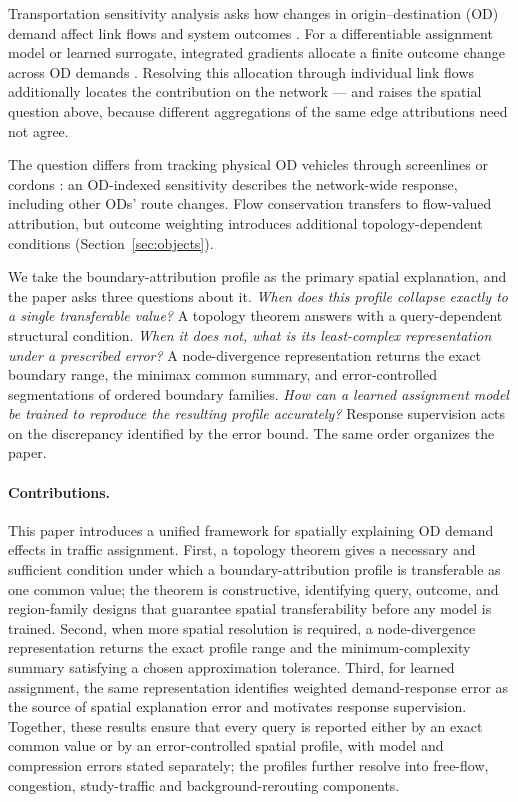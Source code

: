 \documentclass[a4paper,fleqn]{cas-sc}
\begin{document}
Transportation sensitivity analysis asks how changes in origin--destination
(OD) demand affect link flows and system outcomes
\citep{tobin1988sensitivity,josefsson2007sensitivity,patriksson2003aggregated}.
For a differentiable assignment model or learned surrogate, integrated
gradients allocate a finite outcome change across OD demands
\citep{sundararajan2017axiomatic}. Resolving this allocation through
individual link flows additionally locates the contribution on the
network --- and raises the spatial question above, because different
aggregations of the same edge attributions need not agree.

The question differs from tracking physical OD vehicles through screenlines
or cordons \citep{sheffi1985urban,vanzuylen1980most,bar2002origin}:
an OD-indexed sensitivity describes the network-wide response,
including other ODs' route changes. Flow conservation transfers to
flow-valued attribution, but outcome weighting introduces additional
topology-dependent conditions (Section~\ref{sec:objects}).

We take the boundary-attribution profile as the primary spatial
explanation, and the paper asks three questions about it. \emph{When
does this profile collapse exactly to a single transferable value?} A
topology theorem answers with a query-dependent structural condition.
\emph{When it does not, what is its least-complex representation under a
prescribed error?} A node-divergence representation returns the exact
boundary range, the minimax common summary, and error-controlled
segmentations of ordered boundary families. \emph{How can a learned
assignment model be trained to reproduce the resulting profile
accurately?} Response supervision acts on the discrepancy identified by
the error bound. The same order organizes the paper.

\paragraph{Contributions.}
This paper introduces a unified framework for spatially explaining OD
demand effects in traffic assignment. First, a topology theorem gives a
necessary and sufficient condition under which a boundary-attribution
profile is transferable as one common value; the theorem is
constructive, identifying query, outcome, and region-family designs
that guarantee spatial transferability before any model is trained.
Second, when more spatial resolution is required, a node-divergence
representation returns the exact profile range and the
minimum-complexity summary satisfying a chosen approximation tolerance.
Third, for learned assignment, the same representation identifies
weighted demand-response error as the source of spatial explanation
error and motivates response supervision. Together, these results
ensure that every query is reported either by an exact common value or
by an error-controlled spatial profile, with model and compression
errors stated separately; the profiles further resolve into free-flow,
congestion, study-traffic and background-rerouting components.
\end{document}
